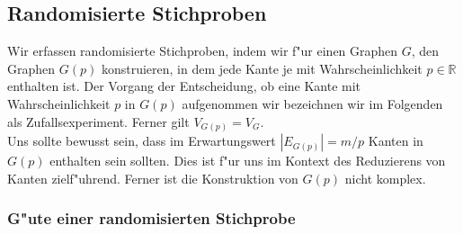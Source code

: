 \subsection{Randomisierte Stichproben}

Wir erfassen randomisierte Stichproben, indem wir f"ur einen Graphen $G$, den
    Graphen $G(p)$ konstruieren, in dem jede Kante je mit Wahrscheinlichkeit 
    $p \in \mathbb{R}$ enthalten ist. 
    Der Vorgang der Entscheidung, ob eine Kante mit Wahrscheinlichkeit $p$
    in $G(p)$ aufgenommen wir bezeichnen wir im Folgenden als Zufallsexperiment.
    Ferner gilt $V_{G(p)} = V_G$.\\
Uns sollte bewusst sein, dass im Erwartungswert $|E_{G(p)}| = m / p$ Kanten
    in $G(p)$ enthalten sein sollten.
    Dies ist f"ur uns im Kontext des Reduzierens von Kanten zielf"uhrend.
    Ferner ist die Konstruktion von $G(p)$ nicht komplex.\\

\subsubsection{G"ute einer randomisierten Stichprobe}
\label{sec:goodnessRand}

